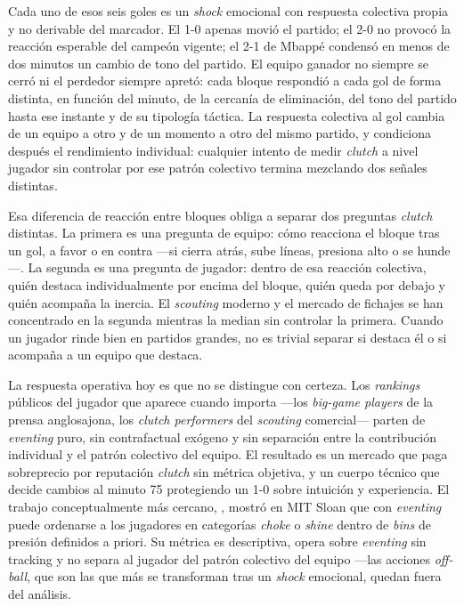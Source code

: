 Cada uno de esos seis goles es un \textit{shock} emocional con respuesta
colectiva propia y no derivable del marcador. El 1-0 apenas movió el
partido; el 2-0 no provocó la reacción esperable del campeón vigente;
el 2-1 de Mbappé condensó en menos de dos minutos un cambio de tono
del partido. El equipo ganador no siempre se cerró ni el
perdedor siempre apretó: cada bloque respondió a cada gol de forma
distinta, en función del minuto, de la cercanía de eliminación, del tono
del partido hasta ese instante y de su tipología táctica. La respuesta
colectiva al gol cambia de un equipo a otro y de un momento a otro del
mismo partido, y condiciona después el rendimiento individual: cualquier
intento de medir \textit{clutch} a nivel jugador sin controlar por ese
patrón colectivo termina mezclando dos señales distintas.

Esa diferencia de reacción entre bloques obliga a separar dos
preguntas \textit{clutch} distintas. La primera es una pregunta de
equipo: cómo reacciona el bloque tras un gol, a favor o en contra
---si cierra atrás, sube líneas, presiona alto o se hunde---. La
segunda es una pregunta de jugador: dentro de esa reacción colectiva,
quién destaca individualmente por encima del bloque, quién queda por
debajo y quién acompaña la inercia. El \textit{scouting} moderno y el mercado de fichajes se han
concentrado en la segunda mientras la median sin controlar la primera.
Cuando un jugador rinde bien en partidos grandes, no es trivial separar
si destaca él o si acompaña a un equipo que destaca.

La respuesta operativa hoy es que no se distingue con certeza. Los
\textit{rankings} públicos del jugador que aparece cuando importa ---los
\textit{big-game players} de la prensa anglosajona, los \textit{clutch
performers} del \textit{scouting} comercial--- parten de
\textit{eventing} puro, sin contrafactual exógeno y sin separación entre
la contribución individual y el patrón colectivo del equipo. El resultado es un mercado que paga sobreprecio por
reputación \textit{clutch} sin métrica objetiva, y un cuerpo técnico que
decide cambios al minuto 75 protegiendo un 1-0 sobre intuición y
experiencia. El trabajo conceptualmente más cercano, \textcite{Bransen2019Choke},
mostró en MIT Sloan que con \textit{eventing} puede ordenarse a los
jugadores en categorías \emph{choke} o \emph{shine} dentro de
\textit{bins} de presión definidos a priori. Su métrica es descriptiva,
opera sobre \textit{eventing} sin tracking y no separa al jugador del
patrón colectivo del equipo ---las acciones \textit{off-ball}, que son
las que más se transforman tras un \textit{shock} emocional, quedan
fuera del análisis.

